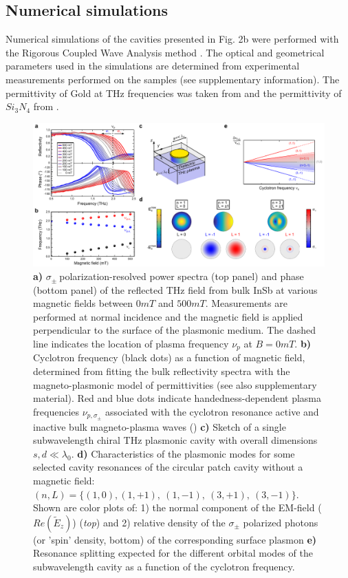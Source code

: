 \documentclass[twocolumn]{article}
\begin{document}
\subsection*{Numerical simulations}

Numerical simulations of the cavities presented in Fig. 2b were performed with the Rigorous Coupled Wave Analysis method \cite{Moharam_1995,Hugonin_2021}. The optical and geometrical parameters used in the simulations are determined from experimental measurements performed on the samples (see supplementary information). The permittivity of Gold at THz frequencies was taken from \cite{Todorov_2010} and the permittivity of $Si_3N_4$ from \cite{Aupiais_2023}.



\begin{figure}[h!]
	\centering %
	\includegraphics[width=\textwidth]{Figure_1.pdf}
	\caption{\textbf{a)} ${\sigma }_{\pm }\ $polarization-resolved power spectra (top panel) and phase (bottom panel) of the reflected THz field from bulk InSb at various magnetic fields between $0mT$ and $500mT$. Measurements are performed at normal incidence and the magnetic field is applied perpendicular to the surface of the plasmonic medium. The dashed line indicates the location of plasma frequency $\nu_p$ at $B=0 mT$. \textbf{b)} Cyclotron frequency (black dots) as a function of magnetic field, determined from fitting the bulk reflectivity spectra with the magneto-plasmonic model of permittivities (see also supplementary material). Red and blue dots indicate handedness-dependent plasma frequencies ${\nu }_{p,{\sigma }_{\pm }}$ associated with the cyclotron resonance active and inactive  bulk magneto-plasma waves (\cite{Palik_1970}) \textbf{c)} Sketch of a single subwavelength chiral THz plasmonic cavity with overall dimensions $s,d\ll \lambda_0 $. \textbf{d)} Characteristics of the plasmonic modes for some selected cavity resonances of the circular patch cavity without a magnetic field: $(n,L)=\{\left(1,0\right),(1,+1),\ (1,-1),\ (3,+1),\ (3,-1)\}$. Shown are color plots of: 1) the normal component of the EM-field ($Re(\tilde{E}_z)$) (\textit{top}) and 2) relative density of the ${\sigma }_{\pm }$ polarized photons (or 'spin' density, bottom) of the corresponding surface plasmon \textbf{e)} Resonance splitting expected for the different orbital modes of the subwavelength cavity as a function of the cyclotron frequency.}
	\label{fig:1}
\end{figure}
\end{document}
